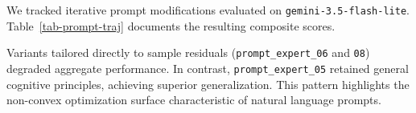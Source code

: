 We tracked iterative prompt modifications evaluated on \texttt{gemini-3.5-flash-lite}. Table~\ref{tab-prompt-traj} documents the resulting composite scores.

Variants tailored directly to sample residuals (\texttt{prompt\_expert\_06} and \texttt{08}) degraded aggregate performance. In contrast, \texttt{prompt\_expert\_05} retained general cognitive principles, achieving superior generalization. This pattern highlights the non-convex optimization surface characteristic of natural language prompts.



